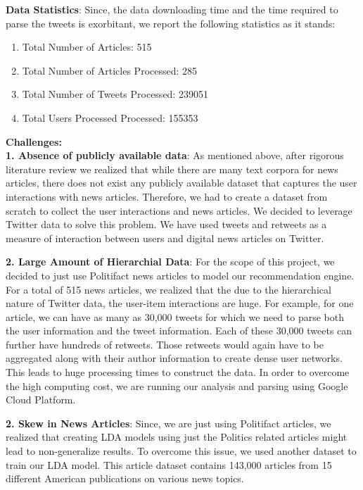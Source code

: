 \documentclass{article}
\begin{document}
\textbf{Data Statistics}:
Since, the data downloading time and the time required to parse the tweets is exorbitant, we report the following statistics as it stands:

\begin{enumerate}
\item Total Number of Articles: 515
\item Total Number of Articles Processed: 285
\item Total Number of Tweets Processed: 239051
\item Total Users Processed Processed: 155353
\end{enumerate}

\textbf{Challenges:}\\
\textbf{1. Absence of publicly available data}: As mentioned above, after rigorous literature review we realized that while there are many text corpora for news articles, there does not exist any publicly available dataset that captures the user interactions with news articles. Therefore, we had to create a dataset from scratch to collect the user interactions and news articles. We decided to leverage Twitter data to solve this problem. We have used tweets and retweets as a measure of interaction between users and digital news articles on Twitter.

\textbf{2. Large Amount of Hierarchial Data}: For the scope of this project, we decided to just use Politifact news articles to model our recommendation engine. For a total of 515 news articles, we realized that the due to the hierarchical nature of Twitter data, the user-item interactions are huge. For example, for one article, we can have as many as 30,000 tweets for which we need to parse both the user information and the tweet information. Each of these 30,000 tweets can further have hundreds of retweets. Those retweets would again have to be aggregated along with their author information to create dense user networks. This leads to huge processing times to construct the data. In order to overcome the high computing cost, we are running our analysis and parsing using Google Cloud Platform.

\textbf{2. Skew in News Articles}: Since, we are just using Politifact articles, we realized that creating LDA models using just the Politics related articles might lead to non-generalize results. To overcome this issue, we used another dataset to train our LDA model. This article dataset contains 143,000 articles from 15 different American publications on various news topics.  
\end{document}
